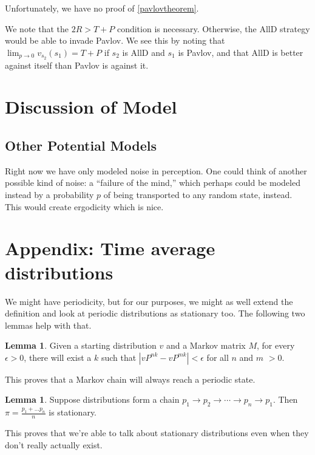 \documentclass[11pt]{amsart}
\theoremstyle{definition}
\newtheorem{lemma}[theorem]{Lemma}
\theoremstyle{remark}
\begin{document}
    Unfortunately, we have no proof of \cref{pavlovtheorem}.

    We note that the $2R > T + P$ condition is necessary. Otherwise, the AllD strategy would be able to invade Pavlov. We see this by noting that $\lim_{p \to 0} v_{s_2}(s_1) = T + P$ if $s_2$ is AllD and $s_1$ is Pavlov, and that AllD is better against itself than Pavlov is against it.



    \section{Discussion of Model}



    \subsection{Other Potential Models}

    Right now we have only modeled noise in perception. One could think of another possible kind of noise: a ``failure of the mind,'' which perhaps could be modeled instead by a probability $p$ of being transported to any random state, instead. This would create ergodicity which is nice.

    \section{Appendix: Time average distributions}

    We might have periodicity, but for our purposes, we might as well extend the definition and look at periodic distributions as stationary too. The following two lemmas help with that.

    \begin{lemma}
      Given a starting distribution $v$ and a Markov matrix $M$, for every $\epsilon > 0$, there will exist a $k$ such that $|vP^{nk} - vP^{mk}| < \epsilon$ for all $n$ and $m$ $> 0$.
    \end{lemma}

    This proves that a Markov chain will always reach a periodic state.

    \begin{lemma}
      Suppose distributions form a chain $p_1 \to p_2 \to \cdots \to p_n \to p_1$. Then $\pi = \frac{p_1 + \ldots p_n}{n}$ is stationary.
    \end{lemma}

    This proves that we're able to talk about stationary distributions even when they don't really actually exist.
\end{document}
